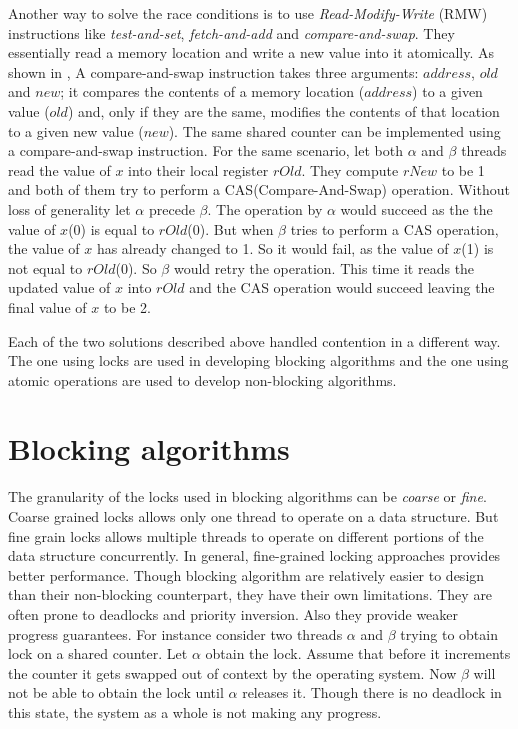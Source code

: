 Another way to solve the race conditions is to use \emph{Read-Modify-Write} (RMW) instructions like \emph{test-and-set}, \emph{fetch-and-add} and \emph{compare-and-swap}.
They essentially read a memory location and write a new value into it atomically.
As shown in , A compare-and-swap  instruction takes three arguments: $address$, $old$ and $new$; it compares the contents of a memory location ($address$) to a given value ($old$) and, only if they are the same, modifies the contents of that location to a given new value ($new$).
The same shared counter can be implemented using a compare-and-swap instruction.
For the same scenario, let both $\alpha$ and $\beta$ threads read the value of $x$ into their local register $rOld$.
They compute $rNew$ to be 1 and both of them try to perform a CAS(Compare-And-Swap) operation.
Without loss of generality let $\alpha$ precede $\beta$.
The operation by $\alpha$ would succeed as the the value of $x$(0) is equal to $rOld$(0).
But when $\beta$ tries to perform a CAS operation, the value of $x$ has already changed to 1.
So it would fail, as the value of $x$(1) is not equal to $rOld$(0).
So $\beta$ would retry the operation.
This time it reads the updated value of $x$ into $rOld$ and the CAS operation would succeed leaving the final value of $x$ to be 2.

Each of the two solutions described above handled contention in a different way.
The one using locks are used in developing blocking algorithms and the one using atomic operations are used to develop non-blocking algorithms.

\section{Blocking algorithms}
The granularity of the locks used in blocking algorithms can be \emph{coarse} or \emph{fine}.
Coarse grained locks allows only one thread to operate on a data structure.
But fine grain locks allows multiple threads to operate on different portions of the data structure concurrently.
In general, fine-grained locking approaches provides better performance.
Though blocking algorithm are relatively easier to design than their non-blocking counterpart, they have their own limitations.
They are often prone to deadlocks and priority inversion.
Also they provide weaker progress guarantees.
For instance consider two threads $\alpha$ and $\beta$ trying to obtain lock on a shared counter.
Let $\alpha$ obtain the lock.
Assume that before it increments the counter it gets swapped out of context by the operating system.
Now $\beta$ will not be able to obtain the lock until $\alpha$ releases it.
Though there is no deadlock in this state, the system as a whole is not making any progress.


